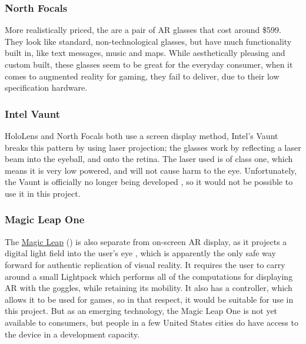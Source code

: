 \subsubsection{North Focals}
More realistically priced, the \citet{northfocals} are a pair of AR glasses that cost around \$599. They look like standard, non-technological glasses, but have much functionality built in, like text messages, music and maps. While aesthetically pleasing and custom built, these glasses seem to be great for the everyday consumer, when it comes to augmented reality for gaming, they fail to deliver, due to their low specification hardware.

\subsubsection{Intel Vaunt}
HoloLens and North Focals both use a screen display method, Intel's Vaunt breaks this pattern by using laser projection; the glasses work by reflecting a laser beam into the eyeball, and onto the retina. The laser used is of class one, which means it is very low powered, and will not cause harm to the eye. Unfortunately, the Vaunt is officially no longer being developed \citep{intelvaunt}, so it would not be possible to use it in this project.

\subsubsection{Magic Leap One}
The \href{https://www.magicleap.com/magic-leap-one}{Magic Leap} (\citeyear{magicleap}) is also separate from on-screen AR display, as it projects a digital light field into the user's eye \citep{redditmagicleap}, which is apparently the only safe way forward for authentic replication of visual reality. It requires the user to carry around a small Lightpack which performs all of the computations for displaying AR with the goggles, while retaining its mobility. It also has a controller, which allows it to be used for games, so in that respect, it would be suitable for use in this project. But as an emerging technology, the Magic Leap One is not yet available to consumers, but people in a few United States cities do have access to the device in a development capacity.

